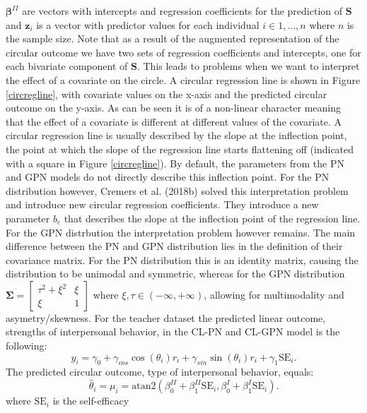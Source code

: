 \documentclass[man]{apa6}
\begin{document}
\(\boldsymbol{\beta}^{II}\) are vectors with intercepts and regression
coefficients for the prediction of \(\boldsymbol{S}\) and \(\boldsymbol{z}_i\) is a
vector with predictor values for each individual \(i \in 1, \dots, n\) where \(n\)
is the sample size. Note that as a result of the augmented representation of the
circular outcome we have two sets of regression coefficients and intercepts, one
for each bivariate component of \(\boldsymbol{S}\). This leads to problems when we
want to interpret the effect of a covariate on the circle. A circular regression
line is shown in Figure \ref{circregline}, with covariate values on the x-axis
and the predicted circular outcome on the y-axis. As can be seen it is of a
non-linear character meaning that the effect of a covariate is different at
different values of the covariate. A circular regression line is usually
described by the slope at the inflection point, the point at which the slope of
the regression line starts flattening off (indicated with a square in Figure
\ref{circregline}). By default, the parameters from the PN and GPN models do not
directly describe this inflection point. For the PN distribution however,
Cremers et al. (2018b) solved this interpretation problem and introduce new
circular regression coefficients. They introduce a new parameter \(b_c\) that
describes the slope at the inflection point of the regression line. For the
GPN distrbution the interpretation problem however remains.\newline
\indent The main difference between the PN and GPN distribution lies in the
definition of their covariance matrix. For the PN distribution this is an
identity matrix, causing the distribution to be unimodal and symmetric, whereas
for the GPN distribution \(\boldsymbol{\Sigma} = \begin{bmatrix} \tau^2 + \xi^2 & \xi\\ \xi & 1 \end{bmatrix}\) where \(\xi,\tau \in (-\infty, +\infty)\), allowing for multimodality and
asymetry/skewness.\newline
\indent For the teacher dataset the predicted linear outcome, strengths of
interpersonal behavior, in the CL-PN and CL-GPN model is the following:
\[\hat{y}_i = \gamma_0 + \gamma_{cos}\cos(\theta_i)r_i +
\gamma_{sin}\sin(\theta_i)r_i + \gamma_1\text{SE}_i.\] The predicted circular
outcome, type of interpersonal behavior, equals: \[\hat{\theta}_i = \mu_i =
\mbox{atan2} (\beta_0^{II} + \beta_1^{II}\text{SE}_i, \beta_0^{I} +
\beta_1^{I}\text{SE}_i).\] \noindent where \(\text{SE}_i\) is the self-efficacy
\end{document}

